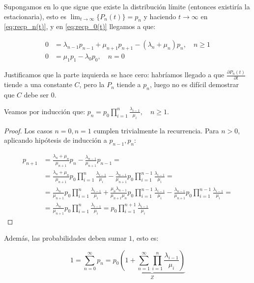 \documentclass[a4paper,10pt]{scrartcl}
\theoremstyle{definition}
\numberwithin{equation}{section}
\begin{document}
Supongamos en lo que sigue que existe la distribución límite (entonces existiría la estacionaria), esto es 
$\lim_{t\rightarrow \infty}\{P_n(t)\} = p_n$ y haciendo $t\rightarrow \infty$ en \eqref{eq:recp_n(t)},
y en \eqref{eq:recp_0(t)} llegamos a que:

\begin{align*}
0 &= \lambda_{n-1} p_{n-1} + \mu_{n+1} p_{n+1} - (\lambda_n + \mu_n) p_n, \quad n\ge 1\\
0 &= \mu_1 p_1 -\lambda_0 p_0, \quad n=0
\end{align*}

Justificamos que la parte izquierda se hace cero: habríamos llegado a que $\frac{\partial P_n(t)}{\partial t}$ tiende a una constante $C$,
pero la $P_n$ tiende a $p_n$, luego no es difícil demostrar que $C$ debe ser 0.

Veamos por inducción que: $p_n = p_0 \prod_{i=1}^n \frac{\lambda_{i-1}}{\mu_i}, \quad n\ge 1$.

\begin{proof}
 Los casos $n=0, n=1$ cumplen trivialmente la recurrencia. Para $n>0$, aplicando hipótesis de inducción a $p_{n-1}, p_{n}$:
 
 \begin{align*}
 p_{n+1} &= \frac{\lambda_n + \mu_n}{\mu_{n+1}} p_n - \frac{\lambda_{n-1}}{\mu_{n+1}}p_{n-1} = \\
         &= \frac{\lambda_n + \mu_n}{\mu_{n+1}} p_0 \prod_{i=1}^n \frac{\lambda_{i-1}}{\mu_i} - 
            \frac{\lambda_{n-1}}{\mu_{n+1}} p_0 \prod_{i=1}^{n-1} \frac{\lambda_{i-1}}{\mu_i} = \\
         &= \frac{\lambda_n}{\mu_{n+1}} p_0 \prod_{i=1}^n \frac{\lambda_{i-1}}{\mu_i} + 
            \frac{\mu_n \lambda_{n-1}}{\mu_{n+1}\mu_n} p_0 \prod_{i=1}^{n-1} \frac{\lambda_{i-1}}{\mu_i} - 
            \frac{\lambda_{n-1}}{\mu_{n+1}} p_0 \prod_{i=1}^{n-1} \frac{\lambda_{i-1}}{\mu_i} = \\
         &= \frac{\lambda_n}{\mu_{n+1}} p_0 \prod_{i=1}^n \frac{\lambda_{i-1}}{\mu_i} = p_0 \prod_{i=1}^{n+1} \frac{\lambda_{i-1}}{\mu_i}
 \end{align*}
\end{proof}

Además, las probabilidades deben sumar $1$, esto es:

\begin{equation}
1 = \sum_{n=0}^{\infty} p_n = p_0 \underbrace{\left(1 + \sum_{n=1}^{\infty} \prod_{i=1}^n \frac{\lambda_{i-1}}{\mu_i} \right)}_{Z}
\label{eq:stabseries}
\end{equation}
\end{document}
